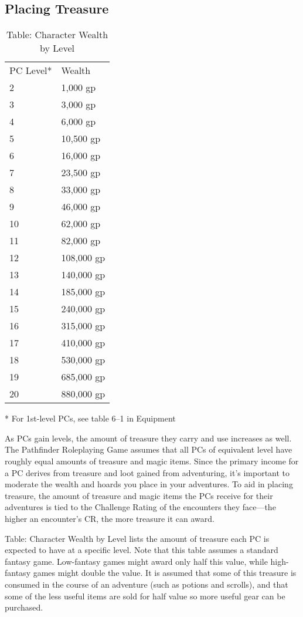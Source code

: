\subsection{Placing Treasure}

\begin{table}[]
\sffamily
\caption{Table: Character Wealth by Level}
\begin{tabular}{ll}
PC Level* & Wealth\\
2 & 1,000 gp \\
 3 & 3,000 gp \\
 4 & 6,000 gp \\
 5 & 10,500 gp \\
 6 & 16,000 gp \\
 7 & 23,500 gp \\
 8 & 33,000 gp \\
 9 & 46,000 gp \\
 10 & 62,000 gp \\
 11 & 82,000 gp \\
 12 & 108,000 gp \\
 13 & 140,000 gp \\
 14 & 185,000 gp \\
 15 & 240,000 gp \\
 16 & 315,000 gp \\
 17 & 410,000 gp \\
 18 & 530,000 gp \\
 19 & 685,000 gp \\
 20 & 880,000 gp\\
\end{tabular}
* For 1st-level PCs, see table 6–1 in Equipment
\end{table}

As PCs gain levels, the amount of treasure they carry and use increases as well. The Pathfinder Roleplaying Game assumes that all PCs of equivalent level have roughly equal amounts of treasure and magic items. Since the primary income for a PC derives from treasure and loot gained from adventuring, it's important to moderate the wealth and hoards you place in your adventures. To aid in placing treasure, the amount of treasure and magic items the PCs receive for their adventures is tied to the Challenge Rating of the encounters they face---the higher an encounter's CR, the more treasure it can award.
				
Table: Character Wealth by Level lists the amount of treasure each PC is expected to have at a specific level. Note that this table assumes a standard fantasy game. Low-fantasy games might award only half this value, while high-fantasy games might double the value. It is assumed that some of this treasure is consumed in the course of an adventure (such as potions and scrolls), and that some of the less useful items are sold for half value so more useful gear can be purchased. 
				
